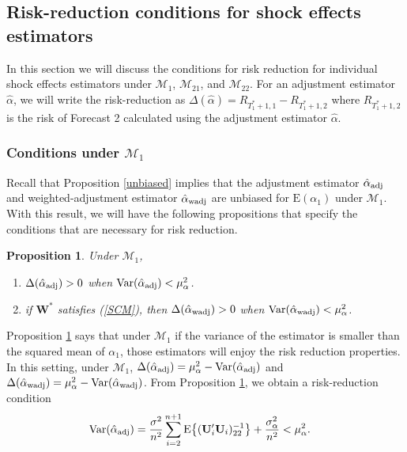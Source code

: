 \documentclass[11pt]{article}
\def\mbf#1{\mathbf{#1}} %
\def\mrm#1{\mathrm{#1}} %
\def\mc#1{\mathcal{#1}} %
\def\E#1{\mathrm{E}(#1)} %
\def\var#1{\mathrm{Var}(#1)} %
\DeclareMathOperator{\Var}{Var} %
\newtheorem{prop}{Proposition}
\theoremstyle{definition}
\begin{document}
\subsection{Risk-reduction conditions for shock effects estimators}
\label{conditions}

In this section we will discuss the conditions for risk reduction for individual shock effects estimators under $\mc{M}_1$, $\mc{M}_{21}$, and $\mc{M}_{22}$. %
For an adjustment estimator $\hat{\alpha}$, we will write the risk-reduction as $\Delta(\hat{\alpha})=R_{T_1^*+1,1}-R_{T_1^*+1,2}$ where $R_{T_1^*+1,2}$ is the risk of Forecast 2 calculated using the adjustment estimator $\hat{\alpha}$. 

\subsubsection{Conditions under $\mc{M}_1$}
 \label{conditionsmodel1}
 
Recall that Proposition \ref{unbiased} implies that the adjustment estimator $\hat{\alpha}_{\rm adj}$ and weighted-adjustment estimator $\hat{\alpha}_{\rm wadj}$ are unbiased for $\E{\alpha_1}$ under $\mc{M}_1$. With this result, we will have  the following propositions that specify the conditions that are necessary for risk reduction. 

\begin{prop}
\label{proprisk}Under $\mc{M}_1$,
\begin{enumerate}[label = (\roman*)]
  \item $\Delta(\hat\alpha_{\rm adj}) > 0$  when 
$\Var(\hat{\alpha}_{\rm adj}) < \mu_{\alpha}^2$.
  \item if $\mbf{W}^*$ satisfies (\ref{SCM}), then $\Delta(\hat\alpha_{\rm wadj}) > 0$ when $\var{\hat{\alpha}_{\rm wadj}}<\mu_{\alpha}^2$. 
\end{enumerate}
\end{prop}


Proposition \ref{proprisk} says that under $\mc{M}_1$ if the variance of the estimator is smaller than the squared mean of $\alpha_1$, those estimators will enjoy the risk reduction properties.   In this setting, under $\mc{M}_1$, $\Delta(\hat{\alpha}_{\rm adj})= \mu_{\alpha}^2-\var{\hat{\alpha}_{\rm adj}}$ and $\Delta(\hat{\alpha}_{\rm wadj})= \mu_{\alpha}^2-\var{\hat{\alpha}_{\rm wadj}}$. %
From Proposition \ref{proprisk}, we obtain a risk-reduction condition
\begin{align}
  \var{\hat{\alpha}_{\rm adj}} 
  &=\frac{\sigma^2}{n^2}\sum_{i=2}^{n+1}\mrm{E}\big\{(\mbf{U}'_i\mbf{U}_i)^{-1}_{22}\big\}+\frac{\sigma^2_{\alpha}}{n^2} < \mu_{\alpha}^2. \label{riskconditionadj}
\end{align}
\end{document}

